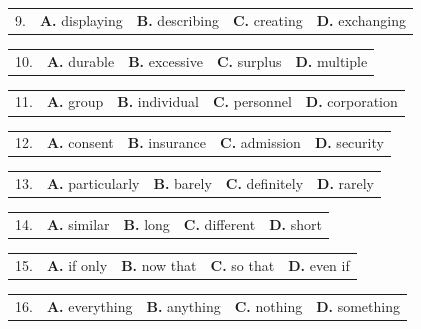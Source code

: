 \documentclass[UTF8,11pt]{ctexart}
\begin{document}
\noindent\begin{tabularx}{\linewidth}{@{}lXXXX@{}}9. & \textbf{A.} displaying & \textbf{B.} describing & \textbf{C.} creating & \textbf{D.} exchanging\\\end{tabularx}\par

\noindent\begin{tabularx}{\linewidth}{@{}lXXXX@{}}10. & \textbf{A.} durable & \textbf{B.} excessive & \textbf{C.} surplus & \textbf{D.} multiple\\\end{tabularx}\par

\noindent\begin{tabularx}{\linewidth}{@{}lXXXX@{}}11. & \textbf{A.} group & \textbf{B.} individual & \textbf{C.} personnel & \textbf{D.} corporation\\\end{tabularx}\par

\noindent\begin{tabularx}{\linewidth}{@{}lXXXX@{}}12. & \textbf{A.} consent & \textbf{B.} insurance & \textbf{C.} admission & \textbf{D.} security\\\end{tabularx}\par

\noindent\begin{tabularx}{\linewidth}{@{}lXXXX@{}}13. & \textbf{A.} particularly & \textbf{B.} barely & \textbf{C.} definitely & \textbf{D.} rarely\\\end{tabularx}\par

\noindent\begin{tabularx}{\linewidth}{@{}lXXXX@{}}14. & \textbf{A.} similar & \textbf{B.} long & \textbf{C.} different & \textbf{D.} short\\\end{tabularx}\par

\noindent\begin{tabularx}{\linewidth}{@{}lXXXX@{}}15. & \textbf{A.} if only & \textbf{B.} now that & \textbf{C.} so that & \textbf{D.} even if\\\end{tabularx}\par

\noindent\begin{tabularx}{\linewidth}{@{}lXXXX@{}}16. & \textbf{A.} everything & \textbf{B.} anything & \textbf{C.} nothing & \textbf{D.} something\\\end{tabularx}\par
\end{document}
